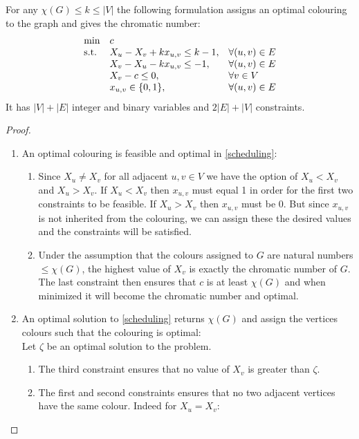 \begin{proposition}
For any $\chi(G) \leq k \leq |V|$ the following formulation assigns an optimal colouring to the graph and gives the chromatic number:
\begin{align}\label{scheduling}
\begin{array}{ll@{}ll}
\text{min} &c&\\
\text{s.t.} 
&X_u - X_v + kx_{u,v} \leq k-1, \quad & \forall (u,v)\in E\\
&X_v - X_u - kx_{u,v} \leq -1,& \forall (u,v)\in E\\
&X_v - c \leq 0,& \forall v \in V\\
&x_{u,v}\in\{0,1\},& \forall (u,v) \in E\\
\end{array}
\end{align}
It has $|V|+|E|$ integer and binary variables and $2|E|+|V|$ constraints.
\begin{proof}
\begin{enumerate}
\item An optimal colouring is feasible and optimal in \ref{scheduling}:\\
\begin{enumerate}
\item Since $X_u \neq X_v$ for all adjacent $u,v\in V$ we have the option of $X_u < X_v$ and $X_u > X_v$. If $X_u < X_v$ then $x_{u,v}$ must equal 1 in order for the first two constraints to be feasible. If $X_u > X_v$ then $x_{u,v}$ must be 0. But since $x_{u,v}$ is not inherited from the colouring, we can assign these the desired values and the constraints will be satisfied.
\item Under the assumption that the colours assigned to $G$ are natural numbers $\leq \chi (G)$, the highest value of $X_v$ is exactly the chromatic number of $G$. The last constraint then ensures that $c$ is at least $\chi (G)$ and when minimized it will become the chromatic number and optimal.
\end{enumerate}
\item An optimal solution to \ref{scheduling} returns $\chi(G)$ and assign the vertices colours such that the colouring is optimal:\\
Let $\zeta$ be an optimal solution to the problem.
\begin{enumerate}
\item The third constraint ensures that no value of $X_v$ is greater than $\zeta$. 
\item The first and second constraints ensures that no two adjacent vertices have the same colour. Indeed for $X_u = X_v$:

\end{enumerate}
\end{enumerate}
\end{proof}
\end{proposition}

